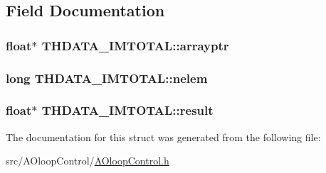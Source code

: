 \subsection{Field Documentation}
\hypertarget{structTHDATA__IMTOTAL_ad6cf52b519e71665d6dc23ac14bec80e}{
\subsubsection[{arrayptr}]{\setlength{\rightskip}{0pt plus 5cm}float$\ast$ T\+H\+D\+A\+T\+A\+\_\+\+I\+M\+T\+O\+T\+A\+L\+::arrayptr}}\label{structTHDATA__IMTOTAL_ad6cf52b519e71665d6dc23ac14bec80e}
\hypertarget{structTHDATA__IMTOTAL_a76ddea2173c5446db1f3af1494aaf696}{
\subsubsection[{nelem}]{\setlength{\rightskip}{0pt plus 5cm}long T\+H\+D\+A\+T\+A\+\_\+\+I\+M\+T\+O\+T\+A\+L\+::nelem}}\label{structTHDATA__IMTOTAL_a76ddea2173c5446db1f3af1494aaf696}
\hypertarget{structTHDATA__IMTOTAL_a9e7c01abf8aad470594aa818ef3335d8}{
\subsubsection[{result}]{\setlength{\rightskip}{0pt plus 5cm}float$\ast$ T\+H\+D\+A\+T\+A\+\_\+\+I\+M\+T\+O\+T\+A\+L\+::result}}\label{structTHDATA__IMTOTAL_a9e7c01abf8aad470594aa818ef3335d8}


The documentation for this struct was generated from the following file\+:\begin{DoxyCompactItemize}
\item 
src/\+A\+Oloop\+Control/\hyperlink{AOloopControl_8h}{A\+Oloop\+Control.\+h}\end{DoxyCompactItemize}
